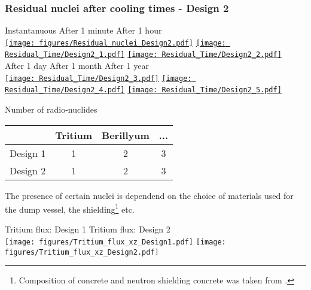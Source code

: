 \documentclass[xcolor={dvipsnames}]{beamer}
\begin{document}
\begin{frame}
  \frametitle{Residual nuclei after cooling times - Design 2}
  \hypertarget{residualtimesprev_Design2}{}
  \begin{center}
    \hspace*{1.6cm} Instantanuous \hfill After 1 minute \hfill After 1 hour \hspace*{1.8cm} \\
  \hyperlink{Residual_nuclei_Design2}{\texttt{[image: figures/Residual\_nuclei\_Design2.pdf]}}
  \hyperlink{Residual_nuclei_minute_Design2}{\texttt{[image: Residual\_Time/Design2\_1.pdf]}}
  \hyperlink{Residual_nuclei_hour_Design2}{\texttt{[image: Residual\_Time/Design2\_2.pdf]}}\\
    \hspace*{1.6cm} After 1 day \hfill After 1 month \hfill After 1 year\hspace*{1.8cm} \\
  \hyperlink{Residual_nuclei_day_Design2}{\texttt{[image: Residual\_Time/Design2\_3.pdf]}}
  \hyperlink{Residual_nuclei_month_Design2}{\texttt{[image: Residual\_Time/Design2\_4.pdf]}}
  \hyperlink{Residual_nuclei_year_Design2}{\texttt{[image: Residual\_Time/Design2\_5.pdf]}}
 \end{center}
\end{frame}

\begin{frame}{Number of radio-nuclides}
\begin{center}
\begin{tabular}{|c|c|c|c|}
\hline
 & Tritium & Berillyum & ... \\
\hline
Design 1 & 1 & 2 & 3\\
\hline
\hline
Design 2 & 1 & 2 & 3\\
\hline
\end{tabular}
\end{center}

The presence of certain nuclei is dependend on the choice of materials used for the dump vessel, the shielding\footnote{Composition of concrete and neutron shielding concrete was taken from \cite{Concrete}.} etc.

\begin{center}
\hspace*{1.6cm} Tritium flux: Design 1 \hfill Tritium flux: Design 2 \hspace*{1.8cm} \\
  \texttt{[image: figures/Tritium\_flux\_xz\_Design1.pdf]}
    \texttt{[image: figures/Tritium\_flux\_xz\_Design2.pdf]}
 \end{center}
\end{frame}
\end{document}
